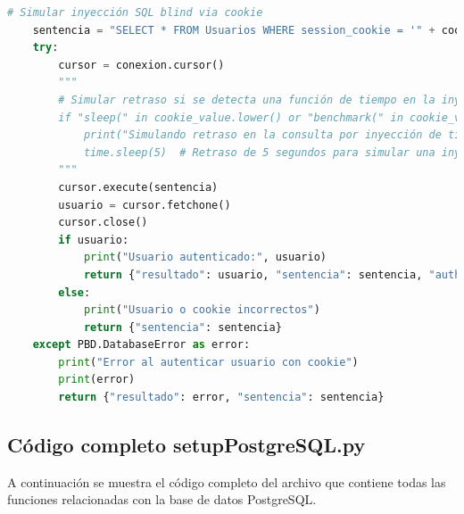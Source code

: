 \documentclass[a4paper,12pt]{article}
\begin{document}
\begin{lstlisting}[language=Python]
    # Simular inyección SQL blind via cookie
    sentencia = "SELECT * FROM Usuarios WHERE session_cookie = '" + cookie_value + "'"
    try:
        cursor = conexion.cursor()
        """
        # Simular retraso si se detecta una función de tiempo en la inyección
        if "sleep(" in cookie_value.lower() or "benchmark(" in cookie_value.lower():
            print("Simulando retraso en la consulta por inyección de tiempo")
            time.sleep(5)  # Retraso de 5 segundos para simular una inyección de tiempo
        """
        cursor.execute(sentencia)
        usuario = cursor.fetchone()
        cursor.close()
        if usuario:
            print("Usuario autenticado:", usuario)
            return {"resultado": usuario, "sentencia": sentencia, "auth": "true"}
        else:
            print("Usuario o cookie incorrectos")
            return {"sentencia": sentencia}
    except PBD.DatabaseError as error:
        print("Error al autenticar usuario con cookie")
        print(error)
        return {"resultado": error, "sentencia": sentencia}
\end{lstlisting}


\subsection{Código completo setupPostgreSQL.py}

A continuación se muestra el código completo del archivo que contiene todas las funciones relacionadas con la base de datos PostgreSQL.
\end{document}
